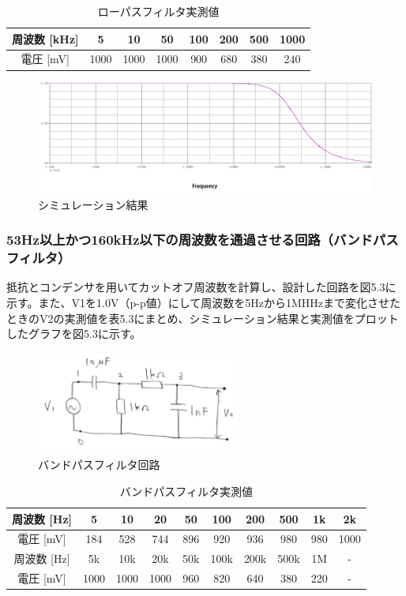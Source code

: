 \documentclass{jlreq}
\numberwithin{equation}{section}
\begin{document}
\begin{table}[H]
  \centering
  \caption{ローパスフィルタ実測値}
  \begin{tabular}{|c|c|c|c|c|c|c|c|}
    \hline
    周波数 [kHz] & 5 & 10 & 50 & 100 & 200 & 500 & 1000 \\ \hline
    電圧 [mV] & 1000 & 1000 & 1000 & 900 & 680 & 380 & 240 \\ \hline
  \end{tabular}
\end{table}

\begin{figure}[H]
  \centering
  \includegraphics[width=\textwidth]{assets/lowpass.png}
  \caption{シミュレーション結果}
\end{figure}

\subsubsection{53Hz以上かつ160kHz以下の周波数を通過させる回路（バンドパスフィルタ）}
抵抗とコンデンサを用いてカットオフ周波数を計算し、設計した回路を図5.3に示す。また、V1を1.0V（p-p値）にして周波数を5Hzから1MHHzまで変化させたときのV2の実測値を表5.3にまとめ、シミュレーション結果と実測値をプロットしたグラフを図5.3に示す。

\begin{figure}[H]
  \centering
  \includegraphics[width=0.6\textwidth]{assets/bandpasskairo.png}
  \caption{バンドパスフィルタ回路}
\end{figure}

\begin{table}[H]
  \centering
    \caption{バンドパスフィルタ実測値}
    \begin{tabular}{|c|c|c|c|c|c|c|c|c|c|}
      \hline
      周波数 [Hz] & 5 & 10 & 20 & 50 & 100 & 200 & 500 & 1k & 2k \\ \hline
      電圧 [mV] & 184 & 528 & 744 & 896 & 920 & 936 & 980 & 980 & 1000 \\ \hline
      \hline
      周波数 [Hz] & 5k & 10k & 20k & 50k & 100k & 200k & 500k & 1M & - \\ \hline
      電圧 [mV] & 1000 & 1000 & 1000 & 960 & 820 & 640 & 380 & 220 & - \\ \hline
    \end{tabular}
\end{table}
\end{document}

